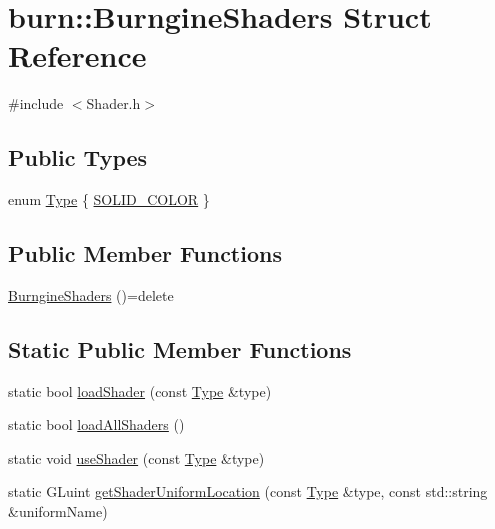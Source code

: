 \hypertarget{structburn_1_1_burngine_shaders}{\section{burn\-:\-:Burngine\-Shaders Struct Reference}
\label{structburn_1_1_burngine_shaders}
}


{\ttfamily \#include $<$Shader.\-h$>$}

\subsection*{Public Types}
\begin{DoxyCompactItemize}
\item 
enum \hyperlink{structburn_1_1_burngine_shaders_a2c339d4b838b7efe94ba8ef7f480ef41}{Type} \{ \hyperlink{structburn_1_1_burngine_shaders_a2c339d4b838b7efe94ba8ef7f480ef41a88513d98f02053992a4d753db14104e1}{S\-O\-L\-I\-D\-\_\-\-C\-O\-L\-O\-R}
 \}
\end{DoxyCompactItemize}
\subsection*{Public Member Functions}
\begin{DoxyCompactItemize}
\item 
\hyperlink{structburn_1_1_burngine_shaders_a7839e417fb8b954b87ece696e48041eb}{Burngine\-Shaders} ()=delete
\end{DoxyCompactItemize}
\subsection*{Static Public Member Functions}
\begin{DoxyCompactItemize}
\item 
static bool \hyperlink{structburn_1_1_burngine_shaders_ab9ebed7c4668a72e7cbbd0630226d7ab}{load\-Shader} (const \hyperlink{structburn_1_1_burngine_shaders_a2c339d4b838b7efe94ba8ef7f480ef41}{Type} \&type)
\item 
static bool \hyperlink{structburn_1_1_burngine_shaders_a33e19e46e7bc1b6d18f05d2ee233dc50}{load\-All\-Shaders} ()
\item 
static void \hyperlink{structburn_1_1_burngine_shaders_a73204821ded279b767394accf6f7ee75}{use\-Shader} (const \hyperlink{structburn_1_1_burngine_shaders_a2c339d4b838b7efe94ba8ef7f480ef41}{Type} \&type)
\item 
static G\-Luint \hyperlink{structburn_1_1_burngine_shaders_adcd311730ecd21d2729199952a5bdf11}{get\-Shader\-Uniform\-Location} (const \hyperlink{structburn_1_1_burngine_shaders_a2c339d4b838b7efe94ba8ef7f480ef41}{Type} \&type, const std\-::string \&uniform\-Name)
\end{DoxyCompactItemize}


